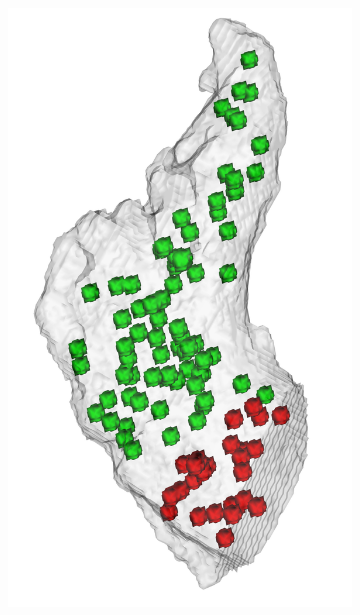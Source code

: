\documentclass[review]{elsarticle}
\begin{document}
\begin{figure}[t]
\begin{subfigure}[b]{.11\linewidth}
    \includegraphics[width=\textwidth]{fig16_5.png}
    \caption{}
  \end{subfigure}%
  \begin{subfigure}[b]{.21\linewidth}
    \centering

\end{subfigure}
\end{figure}
\end{document}
